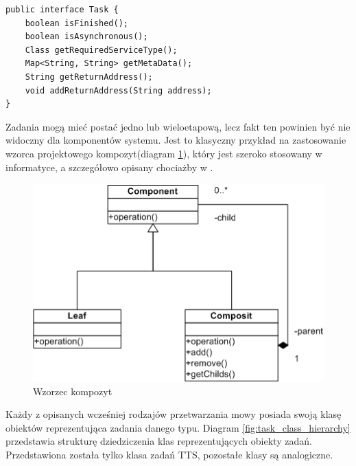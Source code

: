 \lstset{language=Java, tabsize=4, caption=Definicja interfejsu Task w języku Java.,label=lst:task_interface}

\begin{center}
\begin{lstlisting}
public interface Task {
	boolean isFinished();
	boolean isAsynchronous();
	Class getRequiredServiceType();
	Map<String, String> getMetaData();
	String getReturnAddress();
	void addReturnAddress(String address);
}
\end{lstlisting}
\end{center}

Zadania mogą mieć postać jedno lub wieloetapową, lecz fakt ten powinien być nie widoczny dla komponentów systemu. Jest to klasyczny przykład na zastosowanie wzorca projektowego kompozyt(diagram \ref{fig:composite_pattern}), który jest szeroko stosowany w informatyce, a szczegółowo opisany chociażby w \cite{gamma1995}.

\begin{figure}[!h]
	\centering
	\includegraphics[scale=0.7]{composit_pattern.png}
	\caption{Wzorzec kompozyt}\label{fig:composite_pattern}
\end{figure}

Każdy z opisanych wcześniej rodzajów przetwarzania mowy posiada swoją klasę obiektów reprezentująca zadania danego typu. Diagram \ref {fig:task_class_hierarchy} przedstawia strukturę dziedziczenia klas reprezentujących obiekty zadań. Przedstawiona została tylko klasa zadań TTS, pozostałe klasy są analogiczne. 

